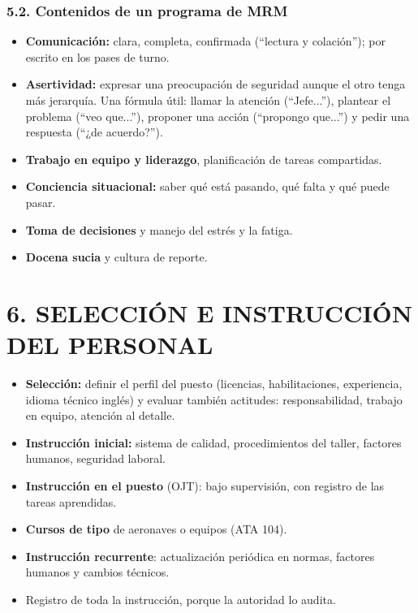 \subsubsection*{5.2. Contenidos de un programa de MRM}
\begin{itemize}
  \item \textbf{Comunicación:} clara, completa, confirmada (``lectura y colación''); por escrito en
        los pases de turno.
  \item \textbf{Asertividad:} expresar una preocupación de seguridad aunque el otro tenga más
        jerarquía. Una fórmula útil: llamar la atención (``Jefe...''), plantear el problema (``veo
        que...''), proponer una acción (``propongo que...'') y pedir una respuesta (``¿de
        acuerdo?'').
  \item \textbf{Trabajo en equipo y liderazgo}, planificación de tareas compartidas.
  \item \textbf{Conciencia situacional:} saber qué está pasando, qué falta y qué puede pasar.
  \item \textbf{Toma de decisiones} y manejo del estrés y la fatiga.
  \item \textbf{Docena sucia} y cultura de reporte.
\end{itemize}

\section*{6. SELECCIÓN E INSTRUCCIÓN DEL PERSONAL}
\begin{itemize}
  \item \textbf{Selección:} definir el perfil del puesto (licencias, habilitaciones, experiencia,
        idioma técnico inglés) y evaluar también actitudes: responsabilidad, trabajo en equipo,
        atención al detalle.
  \item \textbf{Instrucción inicial:} sistema de calidad, procedimientos del taller, factores
        humanos, seguridad laboral.
  \item \textbf{Instrucción en el puesto} (OJT): bajo supervisión, con registro de las tareas
        aprendidas.
  \item \textbf{Cursos de tipo} de aeronaves o equipos (ATA 104).
  \item \textbf{Instrucción recurrente}: actualización periódica en normas, factores humanos y
        cambios técnicos.
  \item Registro de toda la instrucción, porque la autoridad lo audita.
\end{itemize}


